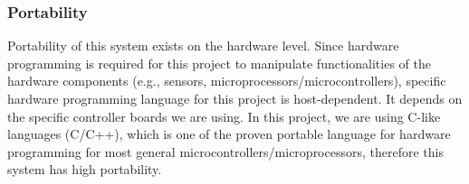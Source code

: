 \subsubsection{Portability}
Portability of this system exists on the hardware level. Since hardware programming is required for this project to manipulate functionalities of the hardware components (e.g., sensors, microprocessors/microcontrollers), specific hardware programming language for this project is host-dependent. It depends on the specific controller boards we are using. In this project, we are using C-like languages (C/C++), which is one of the proven portable language for hardware programming for most general microcontrollers/microprocessors, therefore this system has high portability.








